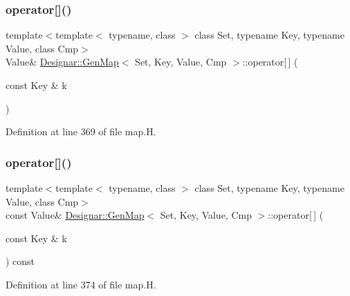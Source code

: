 \subsubsection{\texorpdfstring{operator[]()}{operator[]()}\hspace{0.1cm}{\footnotesize\ttfamily [1/4]}}
{\footnotesize\ttfamily template$<$template$<$ typename, class $>$ class Set, typename Key, typename Value, class Cmp$>$ \\
Value\& \hyperlink{class_designar_1_1_gen_map}{Designar\+::\+Gen\+Map}$<$ Set, Key, Value, Cmp $>$\+::operator\mbox{[}$\,$\mbox{]} (\begin{DoxyParamCaption}\item[{const Key \&}]{k }\end{DoxyParamCaption})\hspace{0.3cm}{\ttfamily [inline]}}



Definition at line 369 of file map.\+H.

\mbox{\label{class_designar_1_1_gen_map_abff00b60a0488eb655696942069eacbc}} 
\subsubsection{\texorpdfstring{operator[]()}{operator[]()}\hspace{0.1cm}{\footnotesize\ttfamily [2/4]}}
{\footnotesize\ttfamily template$<$template$<$ typename, class $>$ class Set, typename Key, typename Value, class Cmp$>$ \\
const Value\& \hyperlink{class_designar_1_1_gen_map}{Designar\+::\+Gen\+Map}$<$ Set, Key, Value, Cmp $>$\+::operator\mbox{[}$\,$\mbox{]} (\begin{DoxyParamCaption}\item[{const Key \&}]{k }\end{DoxyParamCaption}) const\hspace{0.3cm}{\ttfamily [inline]}}



Definition at line 374 of file map.\+H.

\mbox{\label{class_designar_1_1_gen_map_a5e5732a2812ff86e6c5e68f26012cc9c}} 
